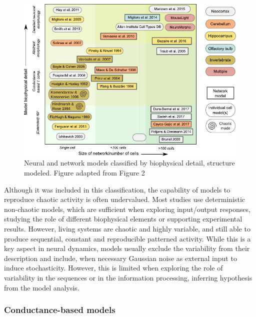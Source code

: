 \begin{figure}[bth!]
	\centering
	\includegraphics[width=\textwidth]{img/intro/models classification.pdf}
	\caption{Neural and network models classified by biophysical detail, structure modeled. Figure adapted from Figure 2 \cite{gleeson_open_2019}}
	\label{fig:models-classification}
\end{figure}
Although it was included in this classification, the capability of models to reproduce chaotic activity is often undervalued. Most studies use deterministic non-chaotic models, which are sufficient when exploring input/output responses, studying the role of different biophysical elements or supporting experimental results. However, living systems are chaotic and highly variable, and still able to produce sequential, constant and reproducible patterned activity. While this is a key aspect in neural dynamics, models usually exclude the variability from their description and include, when necessary Gaussian noise as external input to induce stochasticity. However, this is limited when exploring the role of variability in the sequences or in the information processing, inferring hypothesis from the model analysis.

\subsubsection{Conductance-based models}

